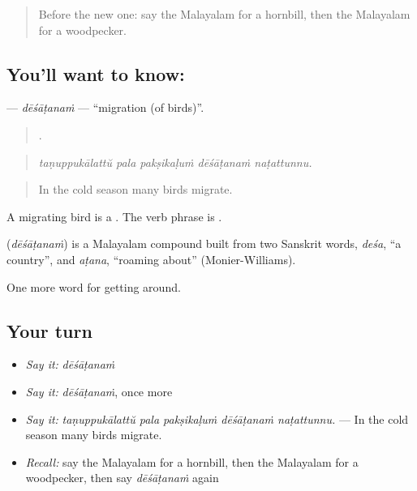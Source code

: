 \label{lesson:ML-C500-desatanam}



\begin{quote}
Before the new one: say the Malayalam for a hornbill, then the Malayalam for a woodpecker.
\end{quote}

\subsection*{You'll want to know: }
\textbf{} — \emph{dēśāṭanaṁ} — \textquotedblleft{}migration (of birds)\textquotedblright{}.

\begin{quote}
    .
\end{quote}

\begin{quote}
\emph{taṇuppukālattŭ pala pakṣikaḷuṁ dēśāṭanaṁ naṭattunnu.}
\end{quote}

\begin{quote}
In the cold season many birds migrate.
\end{quote}

A migrating bird is a . The verb phrase is  .

\begin{cousinweb}
\textbf{} (\emph{dēśāṭanaṁ}) is a Malayalam compound built from two Sanskrit words, \emph{deśa}, \textquotedblleft{}a country\textquotedblright{}, and \emph{aṭana}, \textquotedblleft{}roaming about\textquotedblright{} (Monier-Williams).
\end{cousinweb}

\begin{grammarlens}[title={What you've built}]
One more word for getting around.
\end{grammarlens}

\subsection*{Your turn}
\begin{itemize}
\raggedright
  \item \emph{Say it:} \emph{dēśāṭanaṁ}
  \item \emph{Say it:} \emph{dēśāṭanaṁ}, once more
  \item \emph{Say it:} \emph{taṇuppukālattŭ pala pakṣikaḷuṁ dēśāṭanaṁ naṭattunnu.} — In the cold season many birds migrate.
  \item \emph{Recall:} say the Malayalam for a hornbill, then the Malayalam for a woodpecker, then say \emph{dēśāṭanaṁ} again
\end{itemize}


